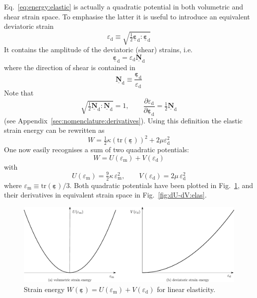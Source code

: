 \documentclass[times,namecite]{goose-article}
\newcommand\T[1]{\underline{\bm{{#1}}}}
\begin{document}
Eq.~\eqref{eq:energy:elastic} is actually a quadratic potential in both volumetric and shear strain space. To emphasise the latter it is useful to introduce an equivalent deviatoric strain
\begin{equation}
  \varepsilon_\mathrm{d} \equiv \sqrt{ \tfrac{1}{2} \T{\varepsilon}_\mathrm{d} : \T{\varepsilon}_\mathrm{d} }
\end{equation}
It contains the amplitude of the deviatoric (shear) strains, i.e.\
\begin{equation}
  \T{\varepsilon}_\mathrm{d} = \varepsilon_\mathrm{d} \T{N}_\mathrm{d}
\end{equation}
where the direction of shear is contained in
\begin{equation}
  \T{N}_\mathrm{d} \equiv \frac{\T{\varepsilon}_\mathrm{d}}{\varepsilon_\mathrm{d}}
\end{equation}
Note that
\begin{equation}
  \sqrt{ \tfrac{1}{2} \T{N}_\mathrm{d} : \T{N}_\mathrm{d} } = 1,
  \qquad
  \frac{\partial \varepsilon_\mathrm{d}}{\partial \T{\varepsilon}_\mathrm{d}} = \tfrac{1}{2} \T{N}_\mathrm{d}
\end{equation}
(see Appendix~\ref{sec:nomenclature:derivatives}). Using this definition the elastic strain energy can be rewritten as
\begin{equation}
  W = \tfrac{1}{2} \kappa \left( \mathrm{tr} ( \T{\varepsilon} ) \right)^2 + 2 \mu \varepsilon_\mathrm{d}^2
\end{equation}
One now easily recognises a sum of two quadratic potentials:
\begin{equation}
  W = U ( \varepsilon_\mathrm{m} ) + V ( \varepsilon_\mathrm{d} )
\end{equation}
with
\begin{equation}
\label{eq:potentials:elastic}
  U ( \varepsilon_\mathrm{m} ) = \tfrac{9}{2} \kappa \, \varepsilon_\mathrm{m}^2,
  \qquad
  V ( \varepsilon_\mathrm{d} ) = 2 \mu \, \varepsilon_\mathrm{d}^2
\end{equation}
where $\varepsilon_\mathrm{m} \equiv \mathrm{tr} ( \T{\varepsilon} ) / 3$. Both quadratic potentials have been plotted in Fig.~\ref{fig:U-V:elas}, and their derivatives in equivalent strain space in Fig.~\ref{fig:dU-dV:elas}.

\begin{figure}[htp]
  \centering
  \includegraphics[width=1.\textwidth]{figures/potential_U-V_elas}
  \caption{Strain energy $W ( \T{\varepsilon} ) = U ( \varepsilon_\mathrm{m} ) + V ( \varepsilon_\mathrm{d} )$ for linear elasticity.}
  \label{fig:U-V:elas}
\end{figure}
\end{document}
